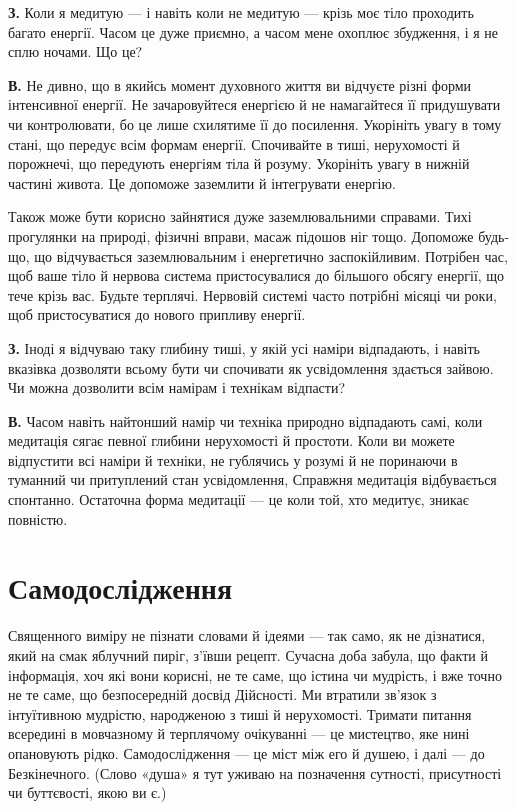 \textbf{З.} Коли я медитую — і навіть коли не медитую — крізь моє тіло проходить багато енергії. Часом це дуже приємно, а часом мене охоплює збудження, і я не сплю ночами. Що це?

\textbf{В.} Не дивно, що в якийсь момент духовного життя ви відчуєте різні форми інтенсивної енергії. Не зачаровуйтеся енергією й не намагайтеся її придушувати чи контролювати, бо це лише схилятиме її до посилення. Укорініть увагу в тому стані, що передує всім формам енергії. Спочивайте в тиші, нерухомості й порожнечі, що передують енергіям тіла й розуму. Укорініть увагу в нижній частині живота. Це допоможе заземлити й інтегрувати енергію.

Також може бути корисно зайнятися дуже заземлювальними справами. Тихі прогулянки на природі, фізичні вправи, масаж підошов ніг тощо. Допоможе будь-що, що відчувається заземлювальним і енергетично заспокійливим. Потрібен час, щоб ваше тіло й нервова система пристосувалися до більшого обсягу енергії, що тече крізь вас. Будьте терплячі. Нервовій системі часто потрібні місяці чи роки, щоб пристосуватися до нового припливу енергії.

\textbf{З.} Іноді я відчуваю таку глибину тиші, у якій усі наміри відпадають, і навіть вказівка дозволяти всьому бути чи спочивати як усвідомлення здається зайвою. Чи можна дозволити всім намірам і технікам відпасти?

\textbf{В.} Часом навіть найтонший намір чи техніка природно відпадають самі, коли медитація сягає певної глибини нерухомості й простоти. Коли ви можете відпустити всі наміри й техніки, не гублячись у розумі й не поринаючи в туманний чи притуплений стан усвідомлення, Справжня медитація відбувається спонтанно. Остаточна форма медитації — це коли той, хто медитує, зникає повністю.

\section*{Самодослідження}

Священного виміру не пізнати словами й ідеями — так само, як не дізнатися, який на смак яблучний пиріг, з'ївши рецепт. Сучасна доба забула, що факти й інформація, хоч які вони корисні, не те саме, що істина чи мудрість, і вже точно не те саме, що безпосередній досвід Дійсності. Ми втратили зв'язок з інтуїтивною мудрістю, народженою з тиші й нерухомості. Тримати питання всередині в мовчазному й терплячому очікуванні — це мистецтво, яке нині опановують рідко. Самодослідження — це міст між его й душею, і далі — до Безкінечного. (Слово «душа» я тут уживаю на позначення сутності, присутності чи буттєвості, якою ви є.)


